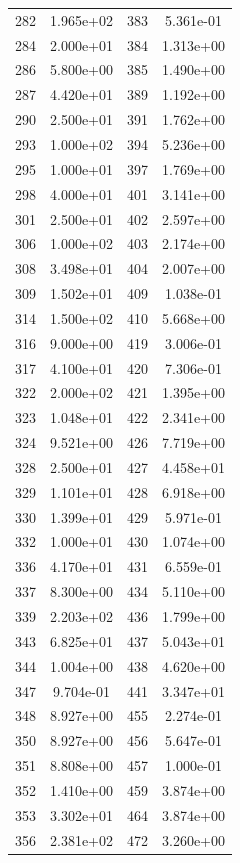 \documentclass[12pt]{article}
\begin{document}
\begin{longtable}{@{}cccc@{}}
282 & 1.965e+02 & 383 & 5.361e-01 \\
284 & 2.000e+01 & 384 & 1.313e+00 \\
286 & 5.800e+00 & 385 & 1.490e+00 \\
287 & 4.420e+01 & 389 & 1.192e+00 \\
290 & 2.500e+01 & 391 & 1.762e+00 \\
293 & 1.000e+02 & 394 & 5.236e+00 \\
295 & 1.000e+01 & 397 & 1.769e+00 \\
298 & 4.000e+01 & 401 & 3.141e+00 \\
301 & 2.500e+01 & 402 & 2.597e+00 \\
306 & 1.000e+02 & 403 & 2.174e+00 \\
308 & 3.498e+01 & 404 & 2.007e+00 \\
309 & 1.502e+01 & 409 & 1.038e-01 \\
314 & 1.500e+02 & 410 & 5.668e+00 \\
316 & 9.000e+00 & 419 & 3.006e-01 \\
317 & 4.100e+01 & 420 & 7.306e-01 \\
322 & 2.000e+02 & 421 & 1.395e+00 \\
323 & 1.048e+01 & 422 & 2.341e+00 \\
324 & 9.521e+00 & 426 & 7.719e+00 \\
328 & 2.500e+01 & 427 & 4.458e+01 \\
329 & 1.101e+01 & 428 & 6.918e+00 \\
330 & 1.399e+01 & 429 & 5.971e-01 \\
332 & 1.000e+01 & 430 & 1.074e+00 \\
336 & 4.170e+01 & 431 & 6.559e-01 \\
337 & 8.300e+00 & 434 & 5.110e+00 \\
339 & 2.203e+02 & 436 & 1.799e+00 \\
343 & 6.825e+01 & 437 & 5.043e+01 \\
344 & 1.004e+00 & 438 & 4.620e+00 \\
347 & 9.704e-01 & 441 & 3.347e+01 \\
348 & 8.927e+00 & 455 & 2.274e-01 \\
350 & 8.927e+00 & 456 & 5.647e-01 \\
351 & 8.808e+00 & 457 & 1.000e-01 \\
352 & 1.410e+00 & 459 & 3.874e+00 \\
353 & 3.302e+01 & 464 & 3.874e+00 \\
356 & 2.381e+02 & 472 & 3.260e+00 \\

\end{longtable}
\end{document}
